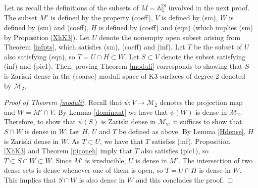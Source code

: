 \documentclass[11pt]{amsart}
\newcommand{\QQ}{\mathbb{Q}}
\theoremstyle{plain}
\theoremstyle{remark}
\begin{document}
Let us recall the definitions of the subsets of $M= \mathbb{A}_\QQ^{28}$ involved in the next proof. The subset $M'$ is defined by the property (coeff), $V$ is defined by (sm), $W$ is defined by (sm) and (coeff), $H$ is defined by (coeff) and (eqn) (which implies (sm) by Proposition \ref{XhK3}). Let $U$ denote the nonempty open subset arising from Theorem \ref{infpts}, which satisfies (sm), (coeff) and (inf). Let $T$ be the subset of $U$ also satisfying (eqn), so $T=U\cap H\subset W$. 
Let $S\subset V$ denote the subset satisfying (inf) and (pic1). Then, proving Theorem \ref{moduli} corresponds to showing that $S$ is Zariski dense in the (coarse) moduli space of K3 surfaces of degree 2 denoted by $\mathcal{M}_2$. 
\begin{proof}[Proof of Theorem \ref{moduli}]
Recall that
$ \psi\colon V \rightarrow \mathcal{M}_2$ denotes
the projection map and $W=M'\cap V$.
By Lemma \ref{dominant} we have that $\psi(W)$ is dense in $\mathcal{M}_2$.
Therefore, to show that $\psi(S)$ is Zariski dense in $\mathcal{M}_2$, it suffices to show that $S\cap W$ is dense in $W$. Let $H$, $U$ and $T$ be defined as above. By Lemma \ref{Hdense}, $H$ is Zariski dense in $W$.
As $T\subset U$, we have that $T$ satisfies (inf). Proposition \ref{XhK3} and Theorem \ref{piconeh} imply that $T$ also satisfies (pic1), so $T\subset S\cap W\subset W$. Since $M'$ is irreducible, $U$ is dense in $M'$. The intersection of two dense sets is dense whenever one of them is open, so $T=U\cap H$ is dense in $W$. This implies that $S\cap W$ is also dense in $W$ and this concludes the proof.
\end{proof}

 
\end{document}
